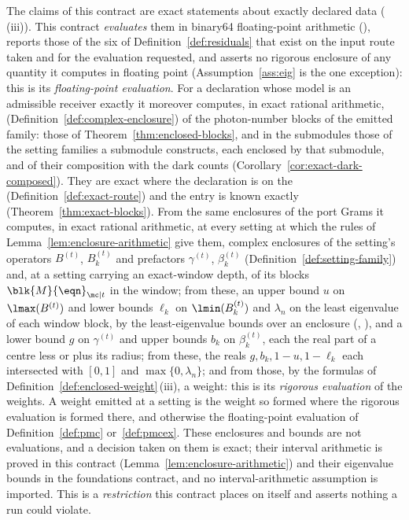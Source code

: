 \begin{definition}
\label{def:evaluation-model}
The claims of this contract are exact statements about exactly declared data
(\,(iii)). This contract \emph{evaluates} them
in binary64 floating-point arithmetic (),
reports those of the six  of Definition~\ref{def:residuals}
that exist on the input route taken and for the evaluation requested, and
asserts no rigorous enclosure of any quantity it computes in floating point
(Assumption~\ref{ass:eig} is the one exception): this is its
\emph{floating-point evaluation}. For a declaration whose
model is an admissible receiver exactly it moreover computes, in exact
rational arithmetic, 
(Definition~\ref{def:complex-enclosure}) of the photon-number blocks of the
emitted family: those of Theorem~\ref{thm:enclosed-blocks}, and in the
submodules those of the setting families a submodule constructs, each
enclosed by that submodule, and of their composition with the dark counts
(Corollary~\ref{cor:exact-dark-composed}). They are exact where
the declaration is on the 
(Definition~\ref{def:exact-route}) and the entry is known exactly
(Theorem~\ref{thm:exact-blocks}). From the same enclosures of the port Grams
it computes, in exact rational arithmetic, at every setting at which the rules
of Lemma~\ref{lem:enclosure-arithmetic} give them, complex enclosures of the
setting's operators $B^{(t)}$, $B^{(t)}_k$ and prefactors $\gamma^{(t)}$,
$\beta^{(t)}_k$ (Definition~\ref{def:setting-family}) and, at a setting
carrying an exact-window depth, of its blocks $\blk{M}{\eqn}_{\mc|t}$ in the
window; from these, an upper bound $u$ on $\lmax(B^{(t)})$ and lower bounds
$\ell_k$ on $\lmin(B^{(t)}_k)$ and $\lambda_n$ on the least eigenvalue of
each window block, by the least-eigenvalue bounds over an enclosure
(,
), and a lower bound $g$
on $\gamma^{(t)}$ and upper bounds $b_k$ on $\beta^{(t)}_k$, each the real
part of a centre less or plus its radius; from these, the reals
$g,b_k,1-u,1-\ell_k$ each intersected with $[0,1]$ and
$\max\{0,\lambda_n\}$; and from those, by the formulas of
Definition~\ref{def:enclosed-weight}\,(iii), a weight: this is its
\emph{rigorous evaluation} of the weights. A weight emitted at a setting is
the weight so formed where the rigorous evaluation is formed there, and
otherwise the floating-point evaluation of Definition~\ref{def:pmc}
or~\ref{def:pmcex}.
These enclosures and bounds are not evaluations, and a decision taken on
them is exact; their interval arithmetic is proved in this contract
(Lemma~\ref{lem:enclosure-arithmetic}) and their eigenvalue bounds in the
foundations contract, and no interval-arithmetic assumption is imported. This
is a \emph{restriction} this contract places on itself and asserts nothing a
run could violate.
\end{definition}
